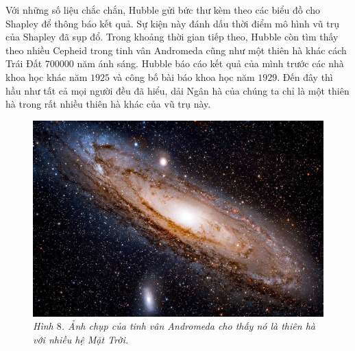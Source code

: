\begin{multicols}{2}
	\vskip 0.1cm
	Với những số liệu chắc chắn, Hubble gửi bức thư kèm theo các biểu đồ cho Shapley để thông báo kết quả. Sự kiện này đánh dấu thời điểm mô hình vũ trụ của Shapley đã sụp đổ. Trong khoảng thời gian tiếp theo, Hubble còn tìm thấy theo nhiều Cepheid trong tinh vân Andromeda cũng như một thiên hà khác cách Trái Đất $700000$ năm ánh sáng. Hubble báo cáo kết quả của mình trước các nhà khoa học khác năm $1925$ và công bố bài báo khoa học năm $1929$. Đến đây thì hầu như tất cả mọi người đều đã hiểu, dải Ngân hà của chúng ta chỉ là một thiên hà trong rất nhiều thiên hà khác của vũ trụ này.
	\begin{figure}[H]
		\vspace*{-5pt}
		\centering
		\captionsetup{labelformat= empty, justification=centering}
		\includegraphics[width= 1\linewidth]{11}
		\caption{\small\textit{\color{timhieukhoahoc}Hình $8$. Ảnh chụp của tinh vân Andromeda cho thấy nó là thiên hà với nhiều hệ Mặt Trời.}}
		\vspace*{-10pt}
	\end{figure}

\end{multicols}
